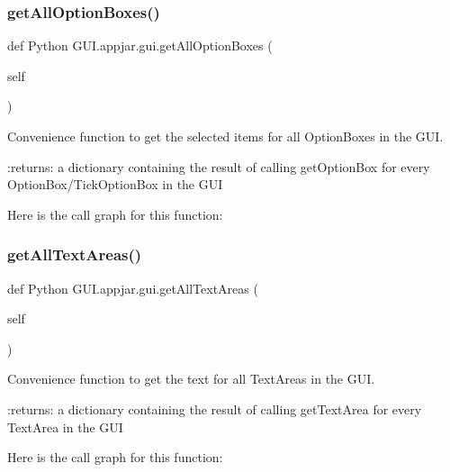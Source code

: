 \subsubsection{\texorpdfstring{get\+All\+Option\+Boxes()}{getAllOptionBoxes()}}
{\footnotesize\ttfamily def Python G\+U\+I.\+appjar.\+gui.\+get\+All\+Option\+Boxes (\begin{DoxyParamCaption}\item[{}]{self }\end{DoxyParamCaption})}

\begin{DoxyVerb}Convenience function to get the selected items for all OptionBoxes in the GUI.

:returns: a dictionary containing the result of calling getOptionBox for every OptionBox/TickOptionBox in the GUI
\end{DoxyVerb}
 Here is the call graph for this function\+:
\mbox{\label{class_python_01_g_u_i_1_1appjar_1_1gui_afe842566f0b718e7ceed8f0d98b1c302}} 
\subsubsection{\texorpdfstring{get\+All\+Text\+Areas()}{getAllTextAreas()}}
{\footnotesize\ttfamily def Python G\+U\+I.\+appjar.\+gui.\+get\+All\+Text\+Areas (\begin{DoxyParamCaption}\item[{}]{self }\end{DoxyParamCaption})}

\begin{DoxyVerb}Convenience function to get the text for all TextAreas in the GUI.

:returns: a dictionary containing the result of calling getTextArea for every TextArea in the GUI
\end{DoxyVerb}
 Here is the call graph for this function\+:
\mbox{\label{class_python_01_g_u_i_1_1appjar_1_1gui_a1c51195c19cb5d9bbd998f08ad9f7dec}} 
